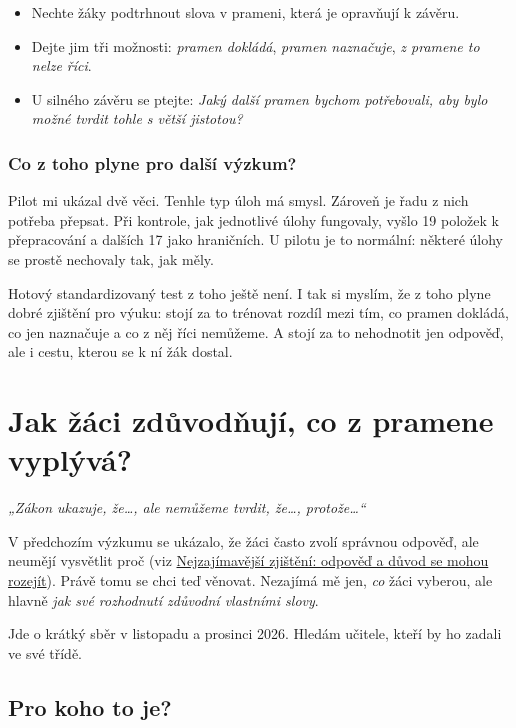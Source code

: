 \documentclass[
  12pt,
  english,
  a4paper,
  extrafontsizes,onecolumn,openright
  ]{memoir}
\providecommand{\tightlist}{%
  \setlength{\itemsep}{0pt}\setlength{\parskip}{0pt}}
\begin{document}
\begin{itemize}
\tightlist
\item
  Nechte žáky podtrhnout slova v prameni, která je opravňují k závěru.
\item
  Dejte jim tři možnosti: \emph{pramen dokládá}, \emph{pramen naznačuje}, \emph{z pramene
  to nelze říci}.
\item
  U silného závěru se ptejte: \emph{Jaký další pramen bychom potřebovali, aby
  bylo možné tvrdit tohle s větší jistotou?}
\end{itemize}

\subsection{Co z toho plyne pro další výzkum?}\label{co-z-toho-plyne-pro-dalux161uxed-vuxfdzkum}

Pilot mi ukázal dvě věci. Tenhle typ úloh má smysl. Zároveň je řadu z nich
potřeba přepsat. Při kontrole, jak jednotlivé úlohy fungovaly, vyšlo 19 položek k
přepracování a dalších 17 jako hraničních. U pilotu je to
normální: některé úlohy se prostě nechovaly tak, jak měly.

Hotový standardizovaný test z toho ještě není. I tak si myslím, že z toho plyne dobré zjištění
pro výuku: stojí za to trénovat rozdíl mezi tím, co pramen
dokládá, co jen naznačuje a co z něj říci nemůžeme. A stojí za to
nehodnotit jen odpověď, ale i cestu, kterou se k ní žák dostal.

\chapter{Jak žáci zdůvodňují, co z pramene vyplývá?}\label{zduvodnovani-z-pramenu}

\emph{„Zákon ukazuje, že\ldots, ale nemůžeme tvrdit, že\ldots, protože\ldots``}

V předchozím výzkumu se ukázalo, že žáci často zvolí správnou odpověď,
ale neumějí vysvětlit proč (viz \hyperref[nejzajuxedmavux11bjux161uxed-zjiux161tux11bnuxed-odpovux11bux10f-a-dux16fvod-se-mohou-rozejuxedt]{Nejzajímavější zjištění: odpověď a
důvod se mohou rozejít}).
Právě tomu se chci teď věnovat. Nezajímá mě jen, \emph{co} žáci vyberou, ale
hlavně \emph{jak své rozhodnutí zdůvodní vlastními slovy}.

Jde o krátký sběr v listopadu a prosinci 2026. Hledám učitele, kteří
by ho zadali ve své třídě.

\section{Pro koho to je?}\label{pro-koho-to-je}
\end{document}
